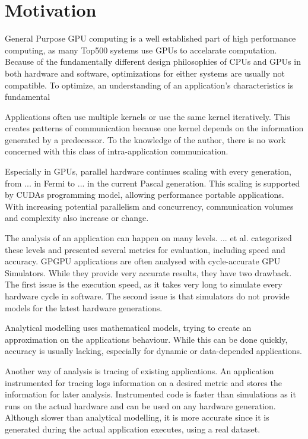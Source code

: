 \chapter{Motivation}
General Purpose GPU computing is a well established part of high performance computing, as many Top500 
systems \cite{} use GPUs to accelarate computation. Because of the fundamentally different design philosophies of CPUs
and GPUs in both hardware and software, optimizations for either systems are usually not compatible. To optimize, an
understanding of an application's characteristics is fundamental

Applications often use multiple kernels or use the same kernel iteratively. This creates patterns of communication because one kernel depends on the information generated by a predecessor. To the knowledge of the author, there is no
work concerned with this class of intra-application communication.

Especially in GPUs, parallel hardware continues scaling with every generation, from ... in Fermi to ... in the current Pascal generation. This scaling is supported by CUDAs programming model, allowing performance portable applications. With increasing potential parallelism and concurrency, communication volumes and complexity also increase or change.

The analysis of an application can happen on many levels. ... et al. \cite{} categorized these levels and presented several 
metrics for evaluation, including speed and accuracy. GPGPU applications are often analysed with cycle-accurate GPU Simulators. While they provide very accurate results, they have two drawback. 
The first issue is the execution speed, as it takes very long to simulate every hardware cycle in software. 
The second issue is that simulators do not provide models for the latest hardware generations.

Analytical modelling uses mathematical models, trying to create an approximation on the applications behaviour.
While this can be done quickly, accuracy is usually lacking, especially for dynamic or data-depended applications.

Another way of analysis is tracing of existing applications. An application instrumented for tracing logs information on a desired metric and stores the information for later analysis. Instrumented code is faster than simulations as it runs on the actual hardware and can be used on any hardware generation. Although slower than analytical modelling, it is  more accurate since it is generated during the actual application executes, using a real dataset.


